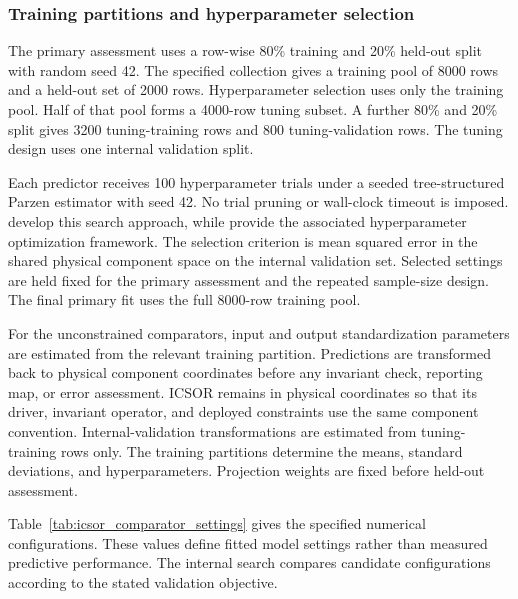 \subsubsection{Training partitions and hyperparameter selection}

The primary assessment uses a row-wise 80\% training and 20\% held-out split with random seed 42. The specified collection gives a training pool of 8000 rows and a held-out set of 2000 rows. Hyperparameter selection uses only the training pool. Half of that pool forms a 4000-row tuning subset. A further 80\% and 20\% split gives 3200 tuning-training rows and 800 tuning-validation rows. The tuning design uses one internal validation split.

Each predictor receives 100 hyperparameter trials under a seeded tree-structured Parzen estimator with seed 42. No trial pruning or wall-clock timeout is imposed. \citet{Bergstra2011} develop this search approach, while \citet{Akiba2019} provide the associated hyperparameter optimization framework. The selection criterion is mean squared error in the shared physical component space on the internal validation set. Selected settings are held fixed for the primary assessment and the repeated sample-size design. The final primary fit uses the full 8000-row training pool.

For the unconstrained comparators, input and output standardization parameters are estimated from the relevant training partition. Predictions are transformed back to physical component coordinates before any invariant check, reporting map, or error assessment. ICSOR remains in physical coordinates so that its driver, invariant operator, and deployed constraints use the same component convention. Internal-validation transformations are estimated from tuning-training rows only. The training partitions determine the means, standard deviations, and hyperparameters. Projection weights are fixed before held-out assessment.

Table~\ref{tab:icsor_comparator_settings} gives the specified numerical configurations. These values define fitted model settings rather than measured predictive performance. The internal search compares candidate configurations according to the stated validation objective.

